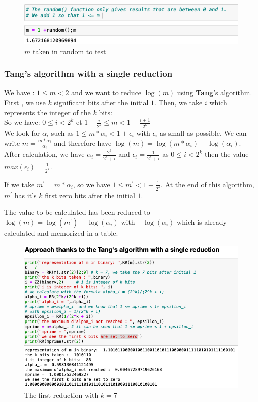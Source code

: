 \begin{figure}[H]
    \centering
    \includegraphics[width=\textwidth]{images/approche_de_Tang/Tang_intro.png}
    \caption{$m$ taken in random to test}
\end{figure}

\subsubsection{\textbf{Tang}'s algorithm with a single reduction}
We have :  $1 \le m < 2$ and we want to reduce $\log(m)$ using \textbf{Tang}'s algorithm.\\
First , we  use $k$ significant bits after the initial $1$. Then, we  take $i$ which represents the integer of the $k$ bits:\\
So we have:  $0 \le i < 2^k$ et $1+\frac{i}{2^k} \le m < 1 +\frac{i+1}{2^k}$\\
We look for $\alpha_i$ such as $1 \le m * \alpha_i < 1+\epsilon_i$ with $\epsilon_i$ as small as possible.
We can write $m = \frac{m * \alpha_i}{\alpha_i}$ and therefore have $\log(m) = \log(m * \alpha_i) - \log(\alpha_i)$.
After calculation, we have $\alpha_i = \frac{2^k}{2^k+i}$ and $\epsilon_i = \frac{1}{2^k+i}$ as $0 \le i < 2^k$ then the value $max(\epsilon_i) = \frac{1}{2^k}$.

If we take $m^{'} =  m * \alpha_i$, so we have $1 \le m^{'} < 1+\frac{1}{2^k}$. At the end of this algorithm,  $m^{'}$ has it's $k$ first zero bits after the initial $1$.

The value to be calculated has been reduced to $\log(m) = \log(m^{'}) - \log(\alpha_i)$ with $-\log(\alpha_i)$ which is already calculated and memorized in a table.\\

\begin{figure}[H]
    \centering
    \includegraphics[width=\textwidth]{images/approche_de_Tang/Tang_1.png}
    \caption{The first reduction with $k = 7$}
\end{figure}


